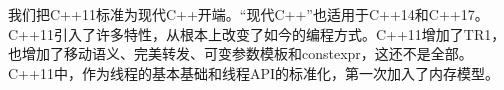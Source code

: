 

我们把C++11标准为现代C++开端。“现代C++”也适用于C++14和C++17。C++11引入了许多特性，从根本上改变了如今的编程方式。C++11增加了TR1，也增加了移动语义、完美转发、可变参数模板和constexpr，这还不是全部。C++11中，作为线程的基本基础和线程API的标准化，第一次加入了内存模型。